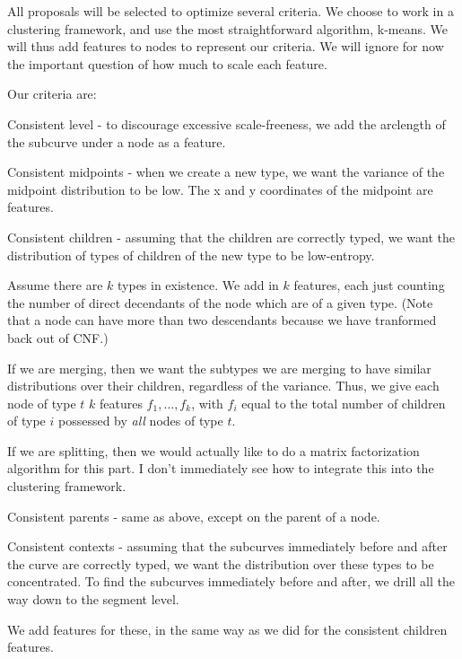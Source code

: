 \documentclass{article}
\begin{document}
\item All proposals will be selected to optimize several criteria.  We
  choose to work in a clustering framework, and use the most
  straightforward algorithm, k-means. We will thus add features to
  nodes to represent our criteria. We will ignore for now the
  important question of how much to scale each feature.

  Our criteria are: \bitem
\item Consistent level - to discourage excessive scale-freeness, we
  add the arclength of the subcurve under a node as a feature.
\item Consistent midpoints - when we create a new type, we want the
  variance of the midpoint distribution to be low. The x and y
  coordinates of the midpoint are features.
\item Consistent children - assuming that the children are correctly
  typed, we want the distribution of types of children of the new type
  to be low-entropy. 

  Assume there are $k$ types in existence. We add in $k$ features,
  each just counting the number of direct decendants of the node which
  are of a given type. (Note that a node can have more than two
  descendants because we have tranformed back out of CNF.)

  If we are merging, then we want the subtypes we are merging to have
  similar distributions over their children, regardless of the
  variance. Thus, we give each node of type $t$ $k$ features
  $f_1,\dots,f_k$, with $f_i$ equal to the total number of children of
  type $i$ possessed by {\em all} nodes of type $t$.

  If we are splitting, then we would actually like to do a matrix
  factorization algorithm for this part. I don't immediately see how
  to integrate this into the clustering framework.

\item Consistent parents - same as above, except on the parent of a node.

\item Consistent contexts - assuming that the subcurves immediately
  before and after the curve are correctly typed, we want the
  distribution over these types to be concentrated. To find the
  subcurves immediately before and after, we drill all the way down to
  the segment level.

  We add features for these, in the same way as we did for the
  consistent children features.
\end{document}
